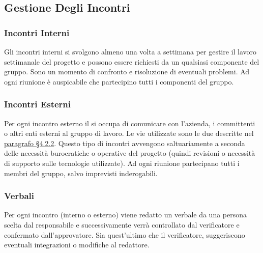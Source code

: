 		\subsection{Gestione Degli Incontri}
		\subsubsection{Incontri Interni}
		Gli incontri interni si svolgono almeno una volta a settimana per gestire il lavoro settimanale del progetto e possono essere richiesti da un qualsiasi componente del gruppo. Sono un momento di confronto e risoluzione di eventuali problemi. Ad ogni riunione è auspicabile che partecipino tutti i componenti del gruppo.
		\subsubsection{Incontri Esterni}
		Per ogni incontro esterno il \RdP{} si occupa di comunicare con l'azienda, i committenti o altri enti esterni al gruppo di lavoro. 
		Le vie utilizzate sono le due descritte nel \hyperref[sec:Comunicazioni Esterne]{paragrafo \S4.2.2}.
		Questo tipo di incontri avvengono saltuariamente a seconda delle necessità burocratiche o operative del progetto (quindi revisioni o necessità di supporto sulle tecnologie utilizzate).
		Ad ogni riunione partecipano tutti i membri del gruppo, salvo imprevisti inderogabili.
		\subsubsection{Verbali}
		Per ogni incontro (interno o esterno) viene redatto un verbale da una persona scelta dal responsabile e successivamente verrà controllato dal verificatore e confermato dall’approvatore. Sia quest'ultimo che il verificatore, suggeriscono eventuali integrazioni o modifiche al redattore.

